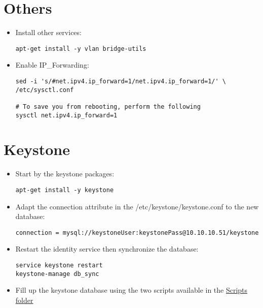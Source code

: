 \section{Others}
\label{others}

\begin{itemize}
\item Install other services:

\begin{verbatim}
apt-get install -y vlan bridge-utils
\end{verbatim}


\item Enable IP\_Forwarding:

\begin{verbatim}
sed -i 's/#net.ipv4.ip_forward=1/net.ipv4.ip_forward=1/' \
/etc/sysctl.conf  

# To save you from rebooting, perform the following  
sysctl net.ipv4.ip_forward=1
\end{verbatim}


\end{itemize}

\section{Keystone}
\label{keystone}

\begin{itemize}
\item Start by the keystone packages:

\begin{verbatim}
apt-get install -y keystone
\end{verbatim}


\item Adapt the connection attribute in the \slash etc\slash keystone\slash keystone.conf to
 the new database:

\begin{verbatim}
connection = mysql://keystoneUser:keystonePass@10.10.10.51/keystone
\end{verbatim}


\item Restart the identity service then synchronize the database:

\begin{verbatim}
service keystone restart  
keystone-manage db_sync
\end{verbatim}


\item Fill up the keystone database using the two scripts available in the
\href{<https://github.com/mseknibilel/OpenStack-Grizzly-Install-Guide/tree/OVS_MultiNode/KeystoneScripts}{Scripts folder} 

\end{itemize}


